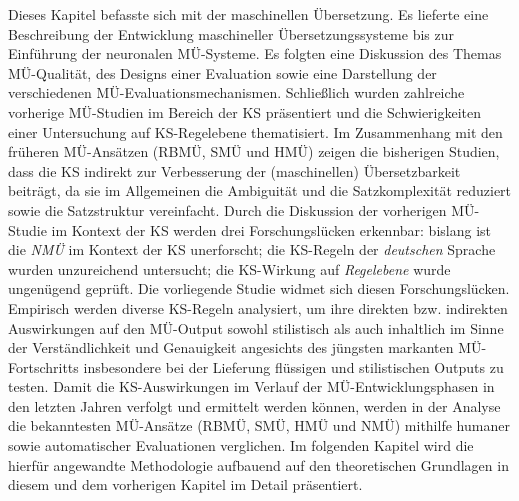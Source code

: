 Dieses Kapitel befasste sich mit der maschinellen Übersetzung. Es lieferte eine Beschreibung der Entwicklung maschineller Übersetzungssysteme bis zur Einführung der neuronalen MÜ-Systeme. Es folgten eine Diskussion des Themas MÜ-Qualität, des Designs einer Evaluation sowie eine Darstellung der verschiedenen MÜ-Evaluationsmechanismen. Schließlich wurden zahlreiche vorherige MÜ-Studien im Bereich der KS präsentiert und die Schwierigkeiten einer Untersuchung auf KS-Regelebene thematisiert. Im Zusammenhang mit den früheren MÜ-Ansätzen (RBMÜ, SMÜ und HMÜ) zeigen die bisherigen Studien, dass die KS indirekt zur Verbesserung der (maschinellen) Übersetzbarkeit beiträgt, da sie im Allgemeinen die Ambiguität und die Satzkomplexität reduziert sowie die Satzstruktur vereinfacht. Durch die Diskussion der vorherigen MÜ-Studie im Kontext der KS werden drei Forschungslücken erkennbar: bislang ist die \textit{NMÜ} im Kontext der KS unerforscht; die KS-Regeln der \textit{deutschen} Sprache wurden unzureichend untersucht; die KS-Wirkung auf \textit{Regelebene} wurde ungenügend geprüft. Die vorliegende Studie widmet sich diesen Forschungslücken. Empirisch werden diverse KS-Regeln analysiert, um ihre direkten bzw. indirekten Auswirkungen auf den MÜ-Output sowohl stilistisch als auch inhaltlich im Sinne der Verständlichkeit und Genauigkeit angesichts des jüngsten markanten MÜ-Fortschritts insbesondere bei der Lieferung flüssigen und stilistischen Outputs zu testen. Damit die KS-Auswirkungen im Verlauf der MÜ-Entwicklungsphasen in den letzten Jahren verfolgt und ermittelt werden können, werden in der Analyse die bekanntesten MÜ-Ansätze (RBMÜ, SMÜ, HMÜ und NMÜ) mithilfe humaner sowie automatischer Evaluationen verglichen. Im folgenden Kapitel wird die hierfür angewandte Methodologie aufbauend auf den theoretischen Grundlagen in diesem und dem vorherigen Kapitel im Detail präsentiert.
